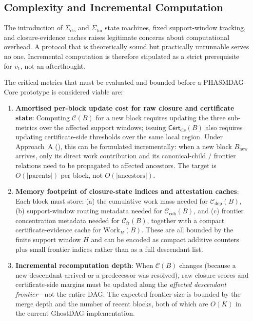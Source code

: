 \documentclass[11pt]{article}
\theoremstyle{definition}
\theoremstyle{plain}
\theoremstyle{remark}
\newcommand{\Clvl}{\mathcal{C}}          %
\newcommand{\Cdep}{\mathcal{C}_{\mathrm{dep}}}
\newcommand{\Ccoh}{\mathcal{C}_{\mathrm{coh}}}
\newcommand{\Cfr}{\mathcal{C}_{\mathrm{fr}}}
\newcommand{\Certcls}{\mathsf{Cert}_{\mathrm{cls}}}
\begin{document}
\subsection{Complexity and Incremental Computation}\label{sec:complexity}

The introduction of $\Sigma_{\mathrm{cls}}$ and $\Sigma_{\mathrm{fin}}$
state machines, fixed support-window tracking, and closure-evidence caches
raises legitimate concerns about computational overhead.  A protocol that is
theoretically sound but practically unrunnable serves no one.
Incremental computation is therefore stipulated as a strict prerequisite for
$v_1$, not an afterthought.

The critical metrics that must be evaluated and bounded before a PHASMDAG-Core
prototype is considered viable are:

\begin{enumerate}[nosep]
    \item \textbf{Amortised per-block update cost for raw closure and certificate state}:
    Computing $\Clvl(B)$ for a new block requires updating the three
    sub-metrics over the affected support windows; issuing $\Certcls(B)$ also
    requires updating certificate-side thresholds over the same local region.
    Under Approach~A (), this can be formulated
    incrementally: when a new block $B_{\mathrm{new}}$ arrives, only its direct
    work contribution and its canonical-child / frontier relations need to be
    propagated to affected ancestors.
    The target is $O(|\mathrm{parents}|)$ per block, not $O(|\mathrm{ancestors}|)$.

    \item \textbf{Memory footprint of closure-state indices and attestation caches}:
    Each block must store: (a) the cumulative work mass needed for
    $\Cdep(B)$, (b) support-window routing metadata needed for $\Ccoh(B)$, and
    (c) frontier concentration metadata needed for $\Cfr(B)$, together with a
    compact certificate-evidence cache for $\mathrm{Work}_H(B)$.
    These are all bounded by the finite support window $H$ and can be encoded as
    compact additive counters plus small frontier indices rather than as a full
    descendant list.

    \item \textbf{Incremental recomputation depth}:
    When $\Clvl(B)$ changes (because a new descendant arrived or a predecessor
    was resolved), raw closure scores and certificate-side margins must be
    updated along the \emph{affected descendant frontier}---not the entire DAG.
    The expected frontier size is bounded by the merge depth and the number of
    recent blocks, both of which are $O(K)$ in the current GhostDAG
    implementation.


\end{enumerate}
\end{document}
